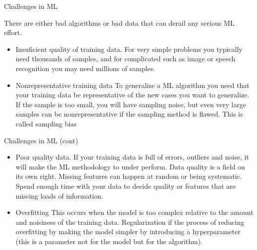 \documentclass{beamer}
\begin{document}
\begin{frame}{Challenges in ML}

	There are either bad algorithms or bad data that can derail any serious ML effort.
	\begin{itemize}
		\item Insuficient quality of training data.
		For very simple problems you typically need thousands of samples, and for complicated such as image or speech recognition you may need millions of samples.
		
		\item Nonrepresentative training data
		To generalize a ML algorithm you need that your training data be representative of the new cases you want to generalize. If the sample is too small, you will have sampling noise, but even very large samples can be nonrepresentative if the sampling method is flawed. This is called sampling bias
	\end{itemize}
	
\end{frame}

\begin{frame}{Challenges in ML (cont)}
	
	\begin{itemize}
		\item 	Poor quality data.
		If your training data is full of errors, outliers and noise, it will make the ML methodology to under perform. Data quality is a field on its own right. Missing features can happen at random or being systematic. Spend enough time with your data to decide quality or features that are missing loads of information.
		\item Overfitting
		This occurs when the model is too complex relative to the amount and noisiness of the training data. Regularization if the process of reducing overfitting by making the model simpler by introducing a hyperparameter (this is a parameter not for the model but for the algorithm).
	\end{itemize}
	
\end{frame}
\end{document}
